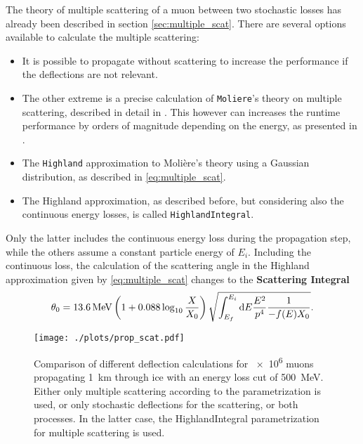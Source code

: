 The theory of multiple scattering of a muon between two stochastic losses has already been described in section \ref{sec:multiple_scat}.
There are several options available to calculate the multiple scattering:
\begin{itemize}
    \item It is possible to propagate without scattering to increase the performance if the deflections are not relevant.
    \item The other extreme is a precise calculation of \texttt{Moliere}'s theory on multiple scattering, described in detail in \cite{Geiselbrinck13Bachelor}.
    This however can increases the runtime performance by orders of magnitude depending on the energy, as presented in \cite{Dunsch19PROPOSAL}.
    \item The \texttt{Highland} approximation to Moli\`{e}re's theory using a Gaussian distribution, as described in \eqref{eq:multiple_scat}.
    \item The Highland approximation, as described before, but considering also the continuous energy losses, is called \texttt{HighlandIntegral}.
\end{itemize}
Only the latter includes the continuous energy loss during the propagation step, while the others assume a constant particle energy of $E_i$.
Including the continuous loss, the calculation of the scattering angle in the Highland approximation given by \eqref{eq:multiple_scat} changes to the \textbf{Scattering Integral}
\begin{align}
    \theta_0 = \SI{13.6}{MeV} \left( 1 + 0.088 \log_{10} \frac{X}{X_0} \right)
        \sqrt{ \int_{E_f}^{E_i} \mathrm{d} E \frac{E^2}{p^4} \frac{1}{-f(E) X_0} } .
\end{align}
\begin{figure}
    \centering
    \texttt{[image: ./plots/prop\_scat.pdf]}
    \caption{Comparison of different deflection calculations for \num{e6} muons propagating \SI{1}{km} through ice with an energy loss cut of \SI{500}{MeV}. Either only multiple scattering according to the parametrization is used, or only stochastic deflections for the scattering, or both processes. In the latter case, the HighlandIntegral parametrization for multiple scattering is used.}
    \label{fig:prop_scat}
\end{figure}
